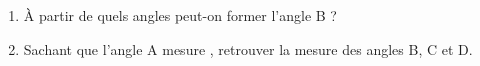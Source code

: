 \begin{activite}
\begin{changemargin}{-10mm}{-15mm}
\begin{enumerate}
            \vspace*{1mm}\dotfill \smallskip
            \item À partir de quels angles peut-on former l'angle B ? \dotfill \smallskip
            \item Sachant que l'angle A mesure , retrouver la mesure des angles B, C et D. \\ [1mm]
            \dotfill \\ [1mm]
            \dotfill \\ [1mm]
            \dotfill %
        \end{enumerate}
    \end{changemargin}
    \vspace*{-20mm}
 \end{activite} 
 
